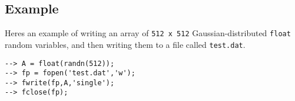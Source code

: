 \subsection{Example}

Heres an example of writing an array of \verb|512 x 512| Gaussian-distributed \verb|float| random variables, and then writing them to a file called \verb|test.dat|.
\begin{verbatim}
--> A = float(randn(512));
--> fp = fopen('test.dat','w');
--> fwrite(fp,A,'single');
--> fclose(fp);
\end{verbatim}
